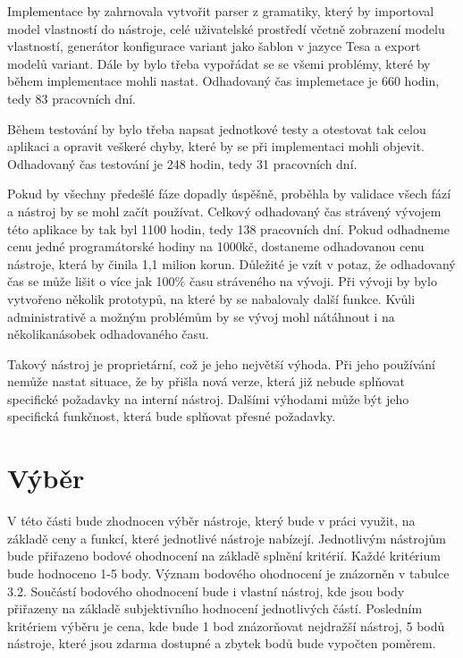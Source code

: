 Implementace by zahrnovala vytvořit parser z gramatiky, který by importoval model vlastností do nástroje, celé uživatelské prostředí včetně zobrazení modelu vlastností, generátor konfigurace variant jako šablon v jazyce Tesa a export modelů variant. Dále by bylo třeba vypořádat se se všemi problémy, které by během implementace mohli nastat. Odhadovaný čas implemetace je 660 hodin, tedy 83 pracovních dní.

Během testování by bylo třeba napsat jednotkové testy a otestovat tak celou aplikaci a opravit veškeré chyby, které by se při implementaci mohli objevit. Odhadovaný čas testování je 248 hodin, tedy 31 pracovních dní.

Pokud by všechny předešlé fáze dopadly úspěšně, proběhla by validace všech fází a nástroj by se mohl začít používat. Celkový odhadovaný čas strávený vývojem této aplikace by tak byl 1100 hodin, tedy 138 pracovních dní. Pokud odhadneme cenu jedné programátorské hodiny na 1000kč, dostaneme odhadovanou cenu nástroje, která by činila 1,1 milion korun. Důležité je vzít v potaz, že odhadovaný čas se může lišit o více jak 100\% času stráveného na vývoji. Při vývoji by bylo vytvořeno několik prototypů, na které by se nabalovaly další funkce. Kvůli administrativě a možným problémům by se vývoj mohl nátáhnout i na několikanásobek odhadovaného času.

Takový nástroj je proprietární, což je jeho největší výhoda. Při jeho používání nemůže nastat situace, že by přišla nová verze, která již nebude splňovat specifické požadavky na interní nástroj. Dalšími výhodami může být jeho specifická funkčnost, která bude splňovat přesné požadavky.

\section{Výběr}
V této části bude zhodnocen výběr nástroje, který bude v práci využit, na základě ceny a funkcí, které jednotlivé nástroje nabízejí. Jednotlivým nástrojům bude přiřazeno bodové ohodnocení na základě splnění kritérií. Každé kritérium bude hodnoceno 1-5 body. Význam bodového ohodnocení je znázorněn v tabulce 3.2. Součástí bodového ohodnocení bude i vlastní nástroj, kde jsou body přiřazeny na základě subjektivního hodnocení jednotlivých částí. Posledním kritériem výběru je cena, kde bude 1 bod znázorňovat nejdražší nástroj, 5 bodů nástroje, které jsou zdarma dostupné a zbytek bodů bude vypočten poměrem.

